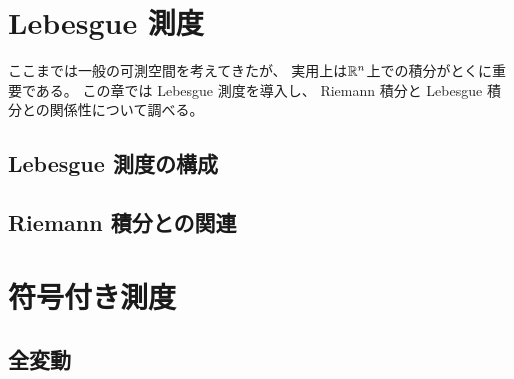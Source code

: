 \documentclass[report]{jlreq}
\begin{document}
%
\chapter{Lebesgue 測度}

ここまでは一般の可測空間を考えてきたが、
実用上は$\mathbb{R}^n$上での積分がとくに重要である。
この章では Lebesgue 測度を導入し、
Riemann 積分と Lebesgue 積分との関係性について調べる。

%
\section{Lebesgue 測度の構成}

\begin{definition}
    \TODO{}
\end{definition}

%
\section{Riemann 積分との関連}




%
\chapter{符号付き測度}

%
\section{全変動}


\begin{definition}[全変動]
    \TODO{}
\end{definition}

%
\end{document}
